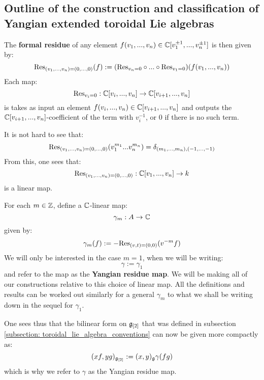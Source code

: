     \subsection{Outline of the construction and classification of Yangian extended toroidal Lie algebras}
        \begin{definition} \label{def: formal_residues}
            The \textbf{formal residue} of any element $f(v_1, ..., v_n) \in \mathbb{C}[v_1^{\pm 1}, ..., v_n^{\pm 1}]$ is then given by:
                $$\mathrm{Res}_{(v_1, ..., v_n) = (0, ..., 0)}(f) := ( \mathrm{Res}_{v_n = 0} \circ ... \circ \mathrm{Res}_{v_1 = 0} )( f(v_1, ..., v_n) )$$
            Each map:
                $$\mathrm{Res}_{v_i = 0}: \mathbb{C}[v_i, ..., v_n] \to \mathbb{C}[v_{i + 1}, ..., v_n]$$
            is takes as input an element $f(v_i, ..., v_n) \in \mathbb{C}[v_{i + 1}, ..., v_n]$ and outputs the $\mathbb{C}[v_{i + 1}, ..., v_n]$-coefficient of the term with $v_i^{-1}$, or $0$ if there is no such term. 
        \end{definition}
        \begin{remark}
            It is not hard to see that:
                $$\mathrm{Res}_{(v_1, ..., v_n) = (0, ..., 0)}( v_1^{m_1} ... v_n^{m_n} ) = \delta_{(m_1, ..., m_n), (-1, ..., -1)}$$
            From this, one sees that:
                $$\mathrm{Res}_{(v_1, ..., v_n) = (0, ..., 0)}: \mathbb{C}[v_1, ..., v_n] \to k$$
            is a linear map.
        \end{remark}
    
        \begin{convention} \label{conv: yangian_residue}
            For each $m \in \mathbb{Z}$, define a $\mathbb{C}$-linear map:
                $$\gamma_m: A \to \mathbb{C}$$
            given by:
                $$\gamma_m(f) := -\mathrm{Res}_{(v, t) = (0, 0)}( v^{-m} f )$$
            We will only be interested in the case $m = 1$, when we will be writing:
                $$\gamma := \gamma_1$$
            and refer to the map as the \textbf{Yangian residue map}. We will be making all of our constructions relative to this choice of linear map. All the definitions and results can be worked out similarly for a general $\gamma_m$ to what we shall be writing down in the sequel for $\gamma_1$.
        \end{convention}
        \begin{remark}
            One sees thus that the bilinear form on $\mathfrak{g}_{[2]}$ that was defined in subsection \ref{subsection: toroidal_lie_algebra_conventions} can now be given more compactly as:
                $$(xf, yg)_{\mathfrak{g}_{[2]}} := (x, y)_{\mathfrak{g}} \gamma(fg)$$
            which is why we refer to $\gamma$ as the Yangian residue map.
        \end{remark}

